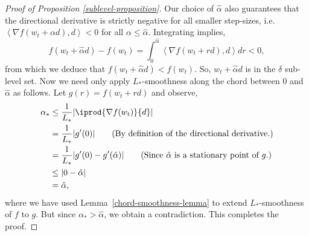 \documentclass[10pt]{article} %
\newcommand{\abr}[1]{\left\langle#1\right\rangle}
\begin{document}
\begin{proof}[Proof of Proposition \ref{sublevel-proposition}]
    Our choice of \( \hat{\alpha} \) also guarantees that the directional
    derivative is strictly negative for all smaller step-sizes, i.e.
    \( \abr{\nabla f(w_t + \alpha d), d} < 0 \) for all 
    \( \alpha \leq \hat{\alpha} \).
    Integrating implies,
    \[
        f(w_t + \hat{\alpha} d) - f(w_t) 
        = \int_{0}^{\hat{\alpha}} \abr{\nabla f(w_t + r d), d} dr
        < 0,
    \]
    from which we deduce that \( f(w_t + \hat{\alpha} d) < f(w_t) \).
    So, \( w_t + \hat{\alpha} d \) is in the \( \delta \) sub-level set.
    Now we need only apply \( L_* \)-smoothness along the chord
    between \( 0 \) and \( \hat{\alpha} \) as follows.
    Let \( g(r) = f(w_t + r d) \) and observe,
    \begin{align*}
        \alpha_{*} & \leq \frac{1}{L_{*}}|\iprod{\nabla f(w_{t})}{d}|                                     \\
                   & = \frac{1}{L_{*}}|g'(0)| \tag{By definition of the directional derivative.}                           \\
                   & = \frac{1}{L_{*}}|g'(0) - g'(\hat{\alpha})| 
                   \tag{Since $\hat{\alpha}$ is a stationary point of $g$.}\\
                   & \leq |0 - \hat{\alpha}|\\
                   &= \hat{\alpha},
    \end{align*}
    where we have used Lemma~\ref{chord-smoothness-lemma} to extend $L_{*}$-smoothness of $f$ to $g$.
    But since $\alpha_{*} > \hat{\alpha}$, we obtain a contradiction. 
    This completes the proof.
\end{proof}
\end{document}
